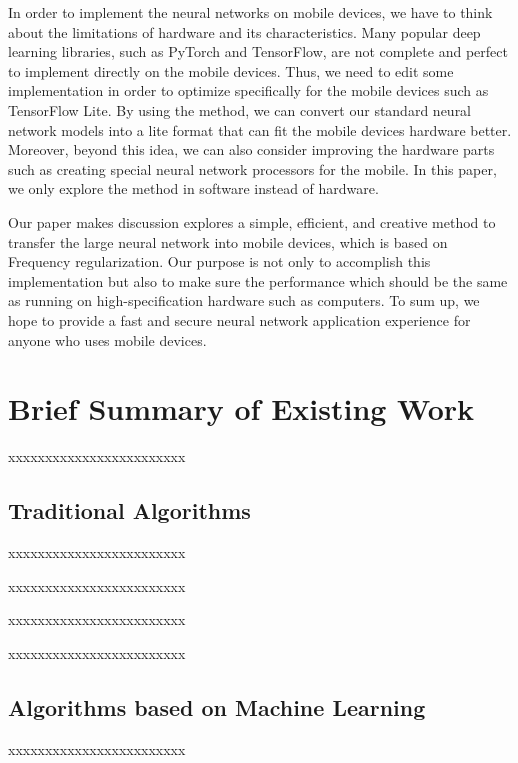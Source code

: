 \documentclass[UTF8]{article}
\begin{document}
In order to implement the neural networks on mobile devices, we have to think about the limitations of hardware and its characteristics. Many popular deep learning libraries, such as PyTorch and TensorFlow, are not complete and perfect to implement directly on the mobile devices. Thus, we need to edit some implementation in order to optimize specifically for the mobile devices such as TensorFlow Lite. By using the method, we can convert our standard neural network models into a lite format that can fit the mobile devices hardware better. Moreover, beyond this idea, we can also consider improving the hardware parts such as creating special neural network processors for the mobile. In this paper, we only explore the method in software instead of hardware.

Our paper makes discussion explores a simple, efficient, and creative method to transfer the large neural network into mobile devices, which is based on Frequency regularization. Our purpose is not only to accomplish this implementation but also to make sure the performance which should be the same as running on high-specification hardware such as computers. To sum up, we hope to provide a fast and secure neural network application experience for anyone who uses mobile devices.



\section*{Brief Summary of Existing Work}

xxxxxxxxxxxxxxxxxxxxxxxx

\subsection{Traditional Algorithms}
xxxxxxxxxxxxxxxxxxxxxxxx

xxxxxxxxxxxxxxxxxxxxxxxx

xxxxxxxxxxxxxxxxxxxxxxxx

xxxxxxxxxxxxxxxxxxxxxxxx

\subsection{Algorithms based on Machine Learning}
xxxxxxxxxxxxxxxxxxxxxxxx
\end{document}
